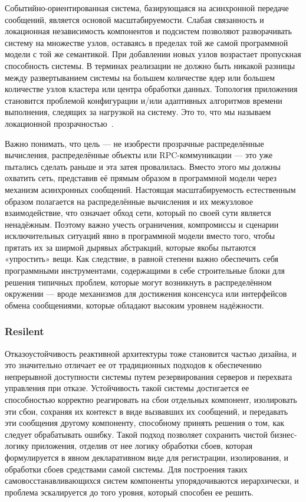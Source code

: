 Событийно-ориентированная система, базирующаяся на асинхронной передаче сообщений, является основой масштабируемости. Слабая связанность и локационная независимость компонентов и подсистем позволяют разворачивать систему на множестве узлов, оставаясь в пределах той же самой программной модели с той же семантикой. При добавлении новых узлов возрастает пропускная способность системы. В терминах реализации не должно быть никакой разницы между развертыванием системы на большем количестве ядер или большем количестве узлов кластера или центра обработки данных. Топология приложения становится проблемой конфигурации и/или адаптивных алгоритмов времени выполнения, следящих за нагрузкой на систему. Это то, что мы называем локационной прозрачностью~\cite{location_transparency}.

Важно понимать, что цель --- не изобрести прозрачные распределённые вычисления, распределённые объекты или RPC-коммуникации --- это уже пытались сделать раньше и эта затея провалилась. Вместо этого мы должны охватить сеть, представив её прямым образом в программной модели через механизм асинхронных сообщений. Настоящая масштабируемость естественным образом полагается на распределённые вычисления и их межузловое взаимодействие, что означает обход сети, который по своей сути является ненадёжным. Поэтому важно учесть ограничения, компромиссы и сценарии исключительных ситуаций явно в программной модели вместо того, чтобы прятать их за ширмой дырявых абстракций, которые якобы пытаются «упростить» вещи. Как следствие, в равной степени важно обеспечить себя программными инструментами, содержащими в себе строительные блоки для решения типичных проблем, которые могут возникнуть в распределённом окружении --- вроде механизмов для достижения консенсуса или интерфейсов обмена сообщениями, которые обладают высоким уровнем надёжности.

\subsubsection{Resilent}
\label{subsub:domain:reactive_programming:resilent}

Отказоустойчивость реактивной архитектуры тоже становится частью дизайна, и это значительно отличает ее от традиционных подходов к обеспечению непрерывной доступности системы путем резервирования серверов и перехвата управления при отказе. Устойчивость такой системы достигается ее способностью корректно реагировать на сбои отдельных компонент, изолировать эти сбои, сохраняя их контекст в виде вызвавших их сообщений, и передавать эти сообщения другому компоненту, способному принять решения о том, как следует обрабатывать ошибку. Такой подход позволяет сохранить чистой бизнес-логику приложения, отделив от нее логику обработки сбоев, которая формулируется в явном декларативном виде для регистрации, изолирования, и обработки сбоев средствами самой системы. Для построения таких самовосстанавливающихся систем компоненты упорядочиваются иерархически, и проблема эскалируется до того уровня, который способен ее решить.

